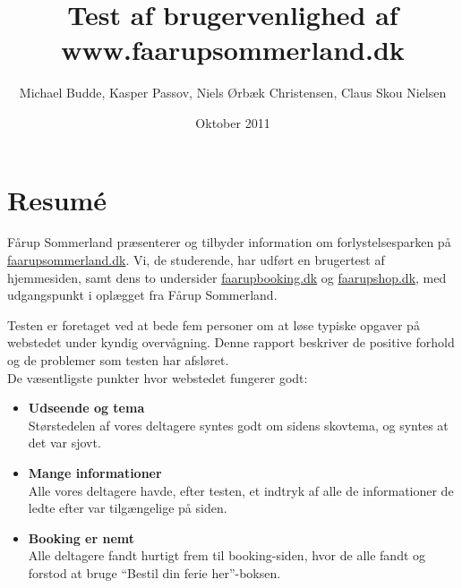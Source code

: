 \documentclass[10pt,a4paper]{article}      %
\author{Michael Budde, Kasper Passov, Niels Ørbæk Christensen, Claus Skou Nielsen}
\title{Test af brugervenlighed af www.faarupsommerland.dk}
\date{Oktober 2011}
\begin{document}
\maketitle
\newpage
\setcounter{page}{1}

\section*{Resumé}
\setcounter{page}{1}

Fårup Sommerland præsenterer og tilbyder information om forlystelsesparken på
\url{faarupsommerland.dk}. Vi, de studerende, har udført en brugertest af
hjemmesiden, samt dens to undersider \url{faarupbooking.dk} og \url{faarupshop.dk}, med
udgangspunkt i oplægget fra Fårup Sommerland.

Testen er foretaget ved at bede fem personer om at løse typiske
opgaver på webstedet under kyndig overvågning. Denne rapport beskriver de
positive forhold og de problemer som testen har afsløret.\\

\noindent De væsentligste punkter hvor webstedet fungerer godt:
\begin{itemize}
    \item \textbf{Udseende og tema}\\
        Størstedelen af vores deltagere syntes godt om sidens skovtema, og
        syntes at det var sjovt. 

    \item \textbf{Mange informationer}\\
        Alle vores deltagere havde, efter testen, et indtryk af alle de
        informationer de ledte efter var tilgængelige på siden. 

    \item \textbf{Booking er nemt}\\
        Alle deltagere fandt hurtigt frem til booking-siden, hvor de alle fandt
        og forstod at bruge ``Bestil din ferie her''-boksen. 
\end{itemize}
\end{document}
